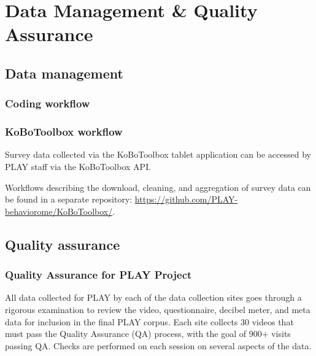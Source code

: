 \documentclass[
  12pt,
]{book}
\begin{document}
\hypertarget{part-data-management-quality-assurance}{%
\part*{Data Management \& Quality Assurance}\label{part-data-management-quality-assurance}}

\hypertarget{data-management}{%
\chapter{Data management}\label{data-management}}

\hypertarget{coding-workflow}{%
\section{Coding workflow}\label{coding-workflow}}

\hypertarget{kobotoolbox-workflow}{%
\section{KoBoToolbox workflow}\label{kobotoolbox-workflow}}

Survey data collected via the KoBoToolbox tablet application can be accessed by PLAY staff via the KoBoToolbox API.

Workflows describing the download, cleaning, and aggregation of survey data can be found in a separate repository: \url{https://github.com/PLAY-behaviorome/KoBoToolbox/}.

\hypertarget{quality-assurance}{%
\chapter{Quality assurance}\label{quality-assurance}}

\hypertarget{quality-assurance-for-play-project}{%
\section{Quality Assurance for PLAY Project}\label{quality-assurance-for-play-project}}

All data collected for PLAY by each of the data collection sites goes through a rigorous examination to review the video, questionnaire, decibel meter, and meta data for inclusion in the final PLAY corpus. Each site collects 30 videos that must pass the Quality Assurance (QA) process, with the goal of 900+ visits passing QA. Checks are performed on each session on several aspects of the data.
\end{document}
